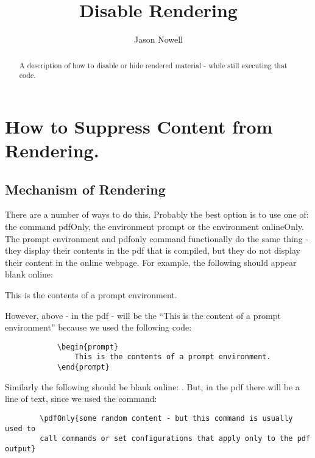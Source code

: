 \documentclass{ximera}
\title{Disable Rendering}
\author{Jason Nowell}
\begin{document}
\begin{abstract}
    A description of how to disable or hide rendered material - while still executing that code.
\end{abstract}
\maketitle
   
\section*{How to Suppress Content from Rendering.}
    \subsection*{Mechanism of Rendering}
        
        There are a number of ways to do this. Probably the best option is to use one of: the command pdfOnly, the environment prompt or the environment onlineOnly. The prompt environment and pdfonly command functionally do the same thing - they display their contents in the pdf that is compiled, but they do not display their content in the online webpage. For example, the following should appear blank online:
        
        \begin{prompt}
            This is the contents of a prompt environment.
        \end{prompt}
        
        However, above - in the pdf - will be the ``This is the content of a prompt environment'' because we used the following code:
        
        \begin{verbatim}
            \begin{prompt}
                This is the contents of a prompt environment.
            \end{prompt}
        \end{verbatim}

        Similarly the following should be blank online: . But, in the pdf there will be a line of text, since we used the command:\\
        
        \begin{verbatim}
        \pdfOnly{some random content - but this command is usually used to 
        call commands or set configurations that apply only to the pdf output}
        \end{verbatim}
        
\end{document}
